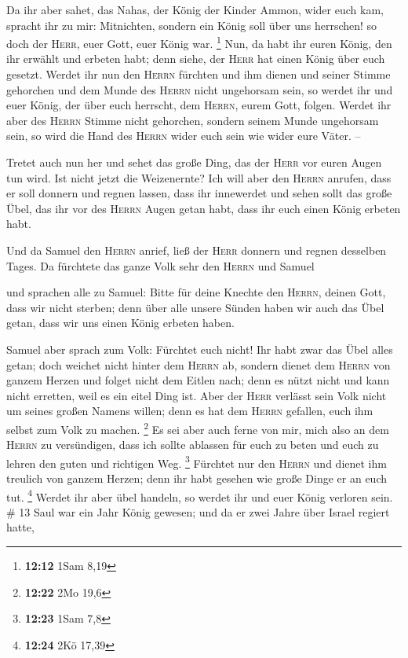  Da ihr aber sahet, das Nahas, der König der Kinder
Ammon, wider euch kam, spracht ihr zu mir: Mitnichten, sondern ein König
soll über uns herrschen! so doch der \textsc{Herr}, euer Gott, euer
König war. \footnote{\textbf{12:12} 1Sam 8,19}  Nun, da
habt ihr euren König, den ihr erwählt und erbeten habt; denn siehe, der
\textsc{Herr} hat einen König über euch gesetzt.  Werdet
ihr nun den \textsc{Herrn} fürchten und ihm dienen und seiner Stimme
gehorchen und dem Munde des \textsc{Herrn} nicht ungehorsam sein, so
werdet ihr und euer König, der über euch herrscht, dem \textsc{Herrn},
eurem Gott, folgen.  Werdet ihr aber des \textsc{Herrn}
Stimme nicht gehorchen, sondern seinem Munde ungehorsam sein, so wird
die Hand des \textsc{Herrn} wider euch sein wie wider eure Väter. --

 Tretet auch nun her und sehet das große Ding, das der
\textsc{Herr} vor euren Augen tun wird.  Ist nicht jetzt
die Weizenernte? Ich will aber den \textsc{Herrn} anrufen, dass er soll
donnern und regnen lassen, dass ihr innewerdet und sehen sollt das große
Übel, das ihr vor des \textsc{Herrn} Augen getan habt, dass ihr euch
einen König erbeten habt.

 Und da Samuel den \textsc{Herrn} anrief, ließ der
\textsc{Herr} donnern und regnen desselben Tages. Da fürchtete das ganze
Volk sehr den \textsc{Herrn} und Samuel

 und sprachen alle zu Samuel: Bitte für deine Knechte den
\textsc{Herrn}, deinen Gott, dass wir nicht sterben; denn über alle
unsere Sünden haben wir auch das Übel getan, dass wir uns einen König
erbeten haben.

 Samuel aber sprach zum Volk: Fürchtet euch nicht! Ihr
habt zwar das Übel alles getan; doch weichet nicht hinter dem
\textsc{Herrn} ab, sondern dienet dem \textsc{Herrn} von ganzem Herzen
 und folget nicht dem Eitlen nach; denn es nützt nicht
und kann nicht erretten, weil es ein eitel Ding ist. 
Aber der \textsc{Herr} verlässt sein Volk nicht um seines großen Namens
willen; denn es hat dem \textsc{Herrn} gefallen, euch ihm selbst zum
Volk zu machen. \footnote{\textbf{12:22} 2Mo 19,6}  Es
sei aber auch ferne von mir, mich also an dem \textsc{Herrn} zu
versündigen, dass ich sollte ablassen für euch zu beten und euch zu
lehren den guten und richtigen Weg. \footnote{\textbf{12:23} 1Sam 7,8}
 Fürchtet nur den \textsc{Herrn} und dienet ihm treulich
von ganzem Herzen; denn ihr habt gesehen wie große Dinge er an euch tut.
\footnote{\textbf{12:24} 2Kö 17,39}  Werdet ihr aber übel
handeln, so werdet ihr und euer König verloren sein. \# 13
 Saul war ein Jahr König gewesen; und da er zwei Jahre
über Israel regiert hatte,

